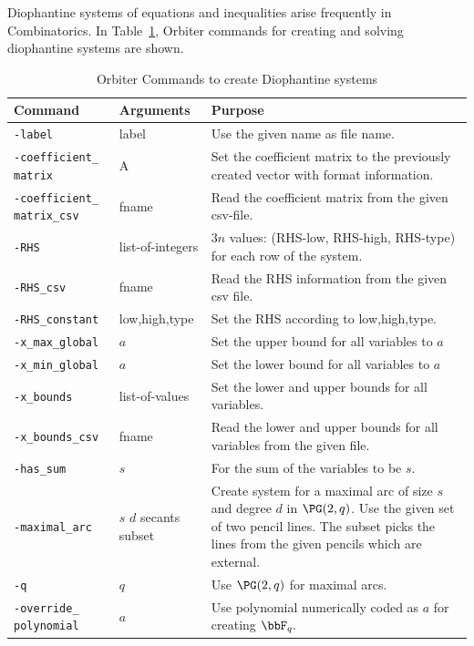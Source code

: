 \bigskip


Diophantine systems of equations and inequalities arise frequently in Combinatorics.
In Table~\ref{tab:diophant}, Orbiter commands for creating and solving diophantine systems are shown.
\begin{table}
	\begin{center}
	\begin{tabular}{|p{4cm}|p{3cm}|p{7cm}|}
		\hline
		Command & Arguments & Purpose \\
		\hline
		\hline
		\verb'-label' & label & Use the given name as file name. \\
		\hline
		\verb'-coefficient_' \verb'matrix' & A  & Set the coefficient matrix to the previously created vector with format information. \\
		\hline
		\verb'-coefficient_' \verb'matrix_csv' & fname  & Read the coefficient matrix from the given csv-file.\\
		\hline
		\verb'-RHS' & list-of-integers  & $3n$ values: (RHS-low, RHS-high, RHS-type) for each row of the system.\\
		\hline
		\verb'-RHS_csv' & fname  & Read the RHS information from the given csv file.\\
		\hline
		\verb'-RHS_constant' & low,high,type  & Set the RHS according to low,high,type.\\
		\hline
		\verb'-x_max_global' & $a$  & Set the upper bound for all variables to $a$ \\
		\hline
		\verb'-x_min_global' & $a$  & Set the lower bound for all variables to $a$ \\
		\hline
		\verb'-x_bounds' & list-of-values  & Set the lower and upper bounds for all variables. \\
		\hline
		\verb'-x_bounds_csv' & fname  & Read the lower and upper bounds for all variables from the given file. \\
		\hline
		\verb'-has_sum' & $s$  & For the sum of the variables to be $s.$ \\
		\hline
		\verb'-maximal_arc' & $s$ $d$ secants subset & Create system for a maximal arc of size $s$ and degree $d$ in $\PG(2,q)$. Use the given set of two pencil lines. The subset picks the lines from the given pencils which are external.  \\
		\hline
		\verb'-q' & $q$  & Use $\PG(2,q)$ for maximal arcs. \\
		\hline
		\verb'-override_' \verb'polynomial' & $a$  & Use polynomial numerically coded as $a$ for creating $\bbF_q.$ \\
		\hline
		\end{tabular}
	\end{center}
	\caption{\label{tab:diophant}Orbiter Commands to create Diophantine systems}
	\end{table}
